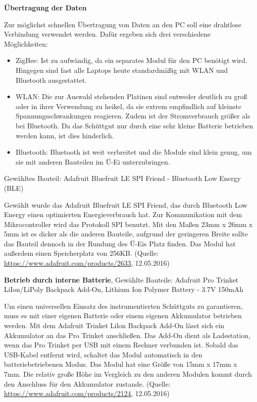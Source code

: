 \textbf{Übertragung der Daten}

Zur möglichst schnellen Übertragung von Daten an den PC soll eine drahtlose Verbindung verwendet werden. Dafür ergeben sich drei verschiedene Möglichkeiten:
\begin{itemize}
	\item ZigBee: Ist zu aufwändig, da ein separates Modul für den PC benötigt wird. Hingegen sind fast alle Laptops heute standardmäßig mit WLAN und Bluetooth ausgestattet.
	\item WLAN: Die zur Auswahl stehenden Platinen sind entweder deutlich zu groß oder in ihrer Verwendung zu heikel, da sie extrem empfindlich auf kleinste Spannungsschwankungen reagieren. Zudem ist der Stromverbrauch größer als bei Bluetooth. Da das Schüttgut nur durch eine sehr kleine Batterie betrieben werden kann, ist dies hinderlich.
	\item Bluetooth: Bluetooth ist weit verbreitet und die Module sind klein genug, um sie mit anderen Bauteilen im Ü-Ei unterzubringen.
\end{itemize}

Gewähltes Bauteil: Adafruit Bluefruit LE SPI Friend - Bluetooth Low Energy (BLE)

Gewählt wurde das Adafruit Bluefruit LE SPI Friend, das durch Bluetooth Low Energy einen optimierten Energieverbrauch hat. Zur Kommunikation mit dem Mikrocontroller wird das Protokoll SPI benutzt. Mit den Maßen 23mm x 26mm x 5mm ist es dicker als die anderen Bauteile, aufgrund der geringeren Breite sollte das Bauteil dennoch in der Rundung des Ü-Eis Platz finden. Das Modul hat außerdem einen Speicherplatz von 256KB. (Quelle: \url{https://www.adafruit.com/products/2633}, 12.05.2016)

\textbf{Betrieb durch interne Batterie}, Gewählte Bauteile: Adafruit Pro Trinket LiIon/LiPoly Backpack Add-On, Lithium Ion Polymer Battery - 3.7V 150mAh

Um einen universellen Einsatz des instrumentierten Schüttguts zu garantieren, muss es mit einer eigenen Batterie oder einem eigenen Akkumulator betrieben werden. 
Mit dem Adafruit Trinket Lilon Backpack Add-On lässt sich ein Akkumulator an das Pro Trinket anschließen. Das Add-On dient als Ladestation, wenn das Pro Trinket per USB mit einem Rechner verbunden ist. Sobald das USB-Kabel entfernt wird, schaltet das Modul automatisch in den batteriebetriebenen Modus. Das Modul hat eine Größe von 15mm x 17mm x 7mm. Die relativ große Höhe im Vergleich zu den anderen Modulen kommt durch den Anschluss für den Akkumulator zustande. (Quelle: \url{https://www.adafruit.com/products/2124}, 12.05.2016)

